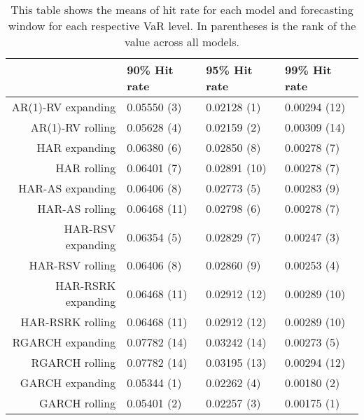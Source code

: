 \begin{table}[ht]
\centering
\begin{tabular}{rlll}
  \hline
 & 90\% Hit rate & 95\% Hit rate & 99\% Hit rate \\ 
  \hline
AR(1)-RV expanding & 0.05550 (3) & 0.02128 (1) & 0.00294 (12) \\ 
  AR(1)-RV rolling & 0.05628 (4) & 0.02159 (2) & 0.00309 (14) \\ 
  HAR expanding & 0.06380 (6) & 0.02850 (8) & 0.00278 (7) \\ 
  HAR rolling & 0.06401 (7) & 0.02891 (10) & 0.00278 (7) \\ 
  HAR-AS expanding & 0.06406 (8) & 0.02773 (5) & 0.00283 (9) \\ 
  HAR-AS rolling & 0.06468 (11) & 0.02798 (6) & 0.00278 (7) \\ 
  HAR-RSV expanding & 0.06354 (5) & 0.02829 (7) & 0.00247 (3) \\ 
  HAR-RSV rolling & 0.06406 (8) & 0.02860 (9) & 0.00253 (4) \\ 
  HAR-RSRK expanding & 0.06468 (11) & 0.02912 (12) & 0.00289 (10) \\ 
  HAR-RSRK rolling & 0.06468 (11) & 0.02912 (12) & 0.00289 (10) \\ 
  RGARCH expanding & 0.07782 (14) & 0.03242 (14) & 0.00273 (5) \\ 
  RGARCH rolling & 0.07782 (14) & 0.03195 (13) & 0.00294 (12) \\ 
  GARCH expanding & 0.05344 (1) & 0.02262 (4) & 0.00180 (2) \\ 
  GARCH rolling & 0.05401 (2) & 0.02257 (3) & 0.00175 (1) \\ 
   \hline
\end{tabular}
\caption[Hit ratio means]{This table shows the means of hit rate for each model and forecasting window for each respective VaR level. In parentheses is the rank of the value across all models. } 
\label{Table:VaR_means_HitRate}
\end{table}
